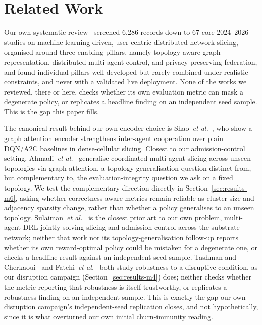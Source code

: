 \documentclass[pdflatex,sn-basic,Numbered]{sn-jnl}%
\begin{document}
\section{Related Work}
\label{sec:litreview}
Our own systematic review~\cite{ref:access} screened 6{,}286 records down to 67 core 2024--2026 studies on machine-learning-driven, user-centric distributed network slicing, organised around three enabling pillars, namely topology-aware graph representation, distributed multi-agent control, and privacy-preserving federation, and found individual pillars well developed but rarely combined under realistic constraints, and never with a validated live deployment. None of the works we reviewed, there or here, checks whether its own evaluation metric can mask a degenerate policy, or replicates a headline finding on an independent seed sample. This is the gap this paper fills.

The canonical result behind our own encoder choice is
Shao~\emph{et al.}~\cite{shao2021gatmarl}, who show a graph attention
encoder strengthens inter-agent cooperation over plain DQN/A2C
baselines in dense-cellular slicing. Closest to our admission-control setting, Ahmadi~\emph{et al.}~\cite{ahmadi2024generalizable} generalise coordinated multi-agent slicing across unseen topologies via graph attention, a topology-generalisation question distinct from, but complementary to, the evaluation-integrity question we ask on a fixed topology. We test the complementary direction directly in Section~\ref{sec:results-m6}, asking whether correctness-aware metrics remain reliable as cluster size and adjacency sparsity change, rather than whether a policy generalises to an unseen topology. Sulaiman~\emph{et
al.}~\cite{sulaiman2023coordinated} is the closest prior art to our own
problem, multi-agent DRL jointly solving slicing and admission control
across the substrate network; neither that work nor its
topology-generalisation follow-up reports whether its own
reward-optimal policy could be mistaken for a degenerate one, or
checks a headline result against an independent seed sample. Tashman and Cherkaoui~\cite{tashman2026adversarial} and Fatehi~\emph{et al.}~\cite{fatehi2026attentionmarl} both study robustness to a disruptive condition, as our disruption campaign (Section~\ref{sec:results-m4}) does; neither checks whether the metric reporting that robustness is itself trustworthy, or replicates a robustness finding on an independent sample. This is exactly the gap our own disruption campaign's independent-seed replication closes, and not hypothetically, since it is what overturned our own initial churn-immunity reading.
\end{document}

